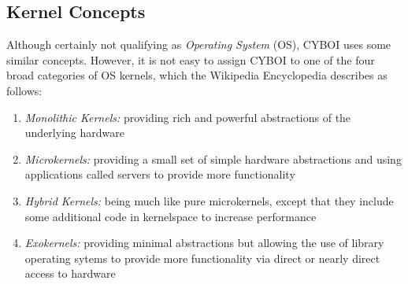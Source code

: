 %
%
%
%
%
%
%

\subsection{Kernel Concepts}
\label{kernel_concepts_heading}

Although certainly not qualifying as \emph{Operating System} (OS), CYBOI uses
some similar concepts. However, it is not easy to assign CYBOI to one of the four
broad categories of OS kernels, which the Wikipedia Encyclopedia \cite{wikipedia}
describes as follows:

\begin{enumerate}
    \item \emph{Monolithic Kernels:} providing rich and powerful abstractions
        of the underlying hardware
    \item \emph{Microkernels:} providing a small set of simple hardware abstractions
        and using applications called servers to provide more functionality
    \item \emph{Hybrid Kernels:} being much like pure microkernels, except that
        they include some additional code in kernelspace to increase performance
    \item \emph{Exokernels:} providing minimal abstractions but allowing the
        use of library operating sytems to provide more functionality via
        direct or nearly direct access to hardware
\end{enumerate}

